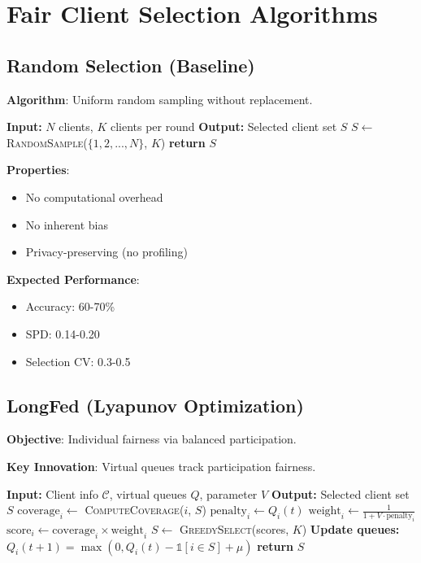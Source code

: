 \documentclass{article}
\begin{document}
\section{Fair Client Selection Algorithms}

\subsection{Random Selection (Baseline)}

\textbf{Algorithm}: Uniform random sampling without replacement.

\begin{algorithm}[H]
\caption{Random Client Selection}
\begin{algorithmic}[1]
\State \textbf{Input:} $N$ clients, $K$ clients per round
\State \textbf{Output:} Selected client set $S$
\State $S \leftarrow$ \textsc{RandomSample}($\{1,2,...,N\}$, $K$)
\State \textbf{return} $S$
\end{algorithmic}
\end{algorithm}

\textbf{Properties}:
\begin{itemize}
    \item No computational overhead
    \item No inherent bias
    \item Privacy-preserving (no profiling)
\end{itemize}

\textbf{Expected Performance}:
\begin{itemize}
    \item Accuracy: 60-70\%
    \item SPD: 0.14-0.20
    \item Selection CV: 0.3-0.5
\end{itemize}

\subsection{LongFed (Lyapunov Optimization)}

\textbf{Objective}: Individual fairness via balanced participation.

\textbf{Key Innovation}: Virtual queues track participation fairness.

\begin{algorithm}[H]
\caption{LongFed Client Selection}
\begin{algorithmic}[1]
\State \textbf{Input:} Client info $\mathcal{C}$, virtual queues $Q$, parameter $V$
\State \textbf{Output:} Selected client set $S$
    \State $\text{coverage}_i \leftarrow$ \textsc{ComputeCoverage}($i$, $S$)
    \State $\text{penalty}_i \leftarrow Q_i(t)$
    \State $\text{weight}_i \leftarrow \frac{1}{1 + V \cdot \text{penalty}_i}$
    \State $\text{score}_i \leftarrow \text{coverage}_i \times \text{weight}_i$
\EndFor
\State $S \leftarrow$ \textsc{GreedySelect}(scores, $K$)
\State \textbf{Update queues:} $Q_i(t+1) = \max(0, Q_i(t) - \mathbb{1}[i \in S] + \mu)$
\State \textbf{return} $S$
\end{algorithmic}
\end{algorithm}
\end{document}
